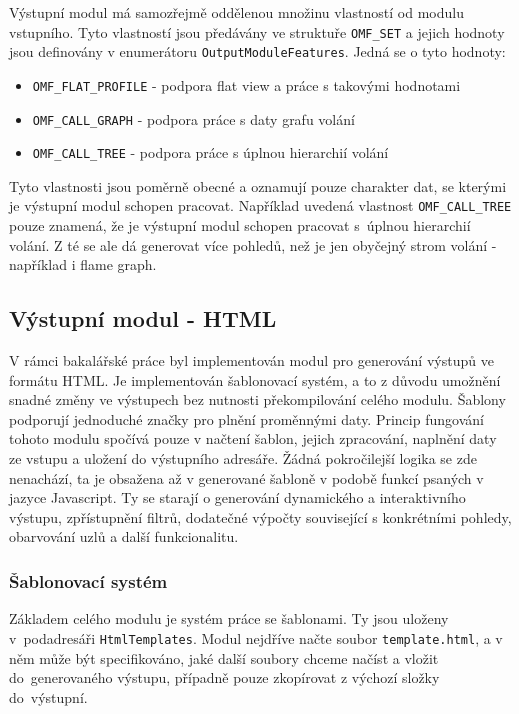 \documentclass[czech,BP]{thesiskiv}
\begin{document}
Výstupní modul má samozřejmě oddělenou množinu vlastností od modulu vstupního. Tyto vlastností jsou předávány ve struktuře \texttt{OMF\_SET} a jejich hodnoty jsou definovány v enumerátoru \texttt{OutputModuleFeatures}. Jedná se o tyto hodnoty:

\begin{itemize}
\item \texttt{OMF\_FLAT\_PROFILE} - podpora flat view a práce s takovými hodnotami
\item \texttt{OMF\_CALL\_GRAPH} - podpora práce s daty grafu volání
\item \texttt{OMF\_CALL\_TREE} - podpora práce s úplnou hierarchií volání
\end{itemize}

Tyto vlastnosti jsou poměrně obecné a oznamují pouze charakter dat, se kterými je výstupní modul schopen pracovat. Například uvedená vlastnost \texttt{OMF\_CALL\_TREE} pouze znamená, že je výstupní modul schopen pracovat s~úplnou hierarchií volání. Z té se ale dá generovat více pohledů, než je jen obyčejný strom volání - například i flame graph.

\subsection{Výstupní modul - HTML}

V rámci bakalářské práce byl implementován modul pro generování výstupů ve formátu HTML. Je implementován šablonovací systém, a to z důvodu umožnění snadné změny ve výstupech bez nutnosti překompilování celého modulu. Šablony podporují jednoduché značky pro plnění proměnnými daty. Princip fungování tohoto modulu spočívá pouze v načtení šablon, jejich zpracování, naplnění daty ze vstupu a uložení do výstupního adresáře. Žádná pokročilejší logika se zde nenachází, ta je obsažena až v generované šabloně v podobě funkcí psaných v jazyce Javascript. Ty se starají o generování dynamického a interaktivního výstupu, zpřístupnění filtrů, dodatečné výpočty související s konkrétními pohledy, obarvování uzlů a další funkcionalitu.

\subsubsection*{Šablonovací systém}

Základem celého modulu je systém práce se šablonami. Ty jsou uloženy v~podadresáři \texttt{HtmlTemplates}. Modul nejdříve načte soubor \texttt{template.html}, a v něm může být specifikováno, jaké další soubory chceme načíst a vložit do~generovaného výstupu, případně pouze zkopírovat z výchozí složky do~výstupní.
\end{document}

